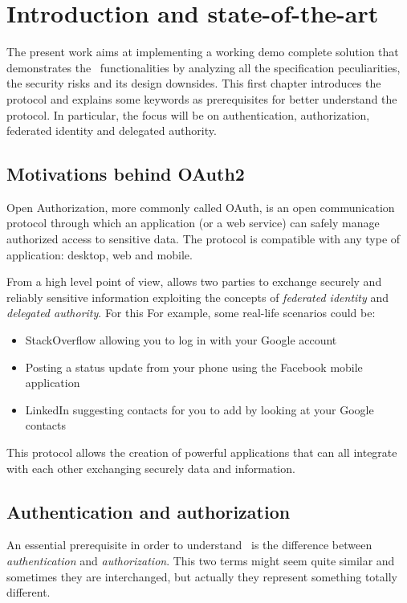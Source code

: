 
\chapter{Introduction and state-of-the-art}
The present work aims at implementing a working demo complete solution that demonstrates the \oauth\ functionalities by analyzing all the specification peculiarities, the security risks and its design downsides. This first chapter introduces the protocol and explains some keywords as prerequisites for better understand the \textit{\oauth} protocol. In particular, the focus will be on authentication, authorization, federated identity and delegated authority.

\section{Motivations behind OAuth2}
Open Authorization, more commonly called OAuth, is an open communication protocol through which an application (or a web service) can safely manage authorized access to sensitive data. The protocol is compatible with any type of application: desktop, web and mobile.

From a high level point of view, \textit{\oauth} allows two parties to exchange securely and reliably sensitive information exploiting the concepts of \textit{federated identity} and \textit{delegated authority}. For this For example, some real-life scenarios could be:

\begin{itemize}
    \item StackOverflow allowing you to log in with your Google account
    \item Posting a status update from your phone using the Facebook mobile application
    \item LinkedIn suggesting contacts for you to add by looking at your Google contacts
\end{itemize}

This protocol allows the creation of powerful applications that can all integrate with each other exchanging securely data and information.

\section{Authentication and authorization}
An essential prerequisite in order to understand \oauth\ is the difference between \textit{authentication} and \textit{authorization}. This two terms might seem quite similar and sometimes they are interchanged, but actually they represent something totally different.

